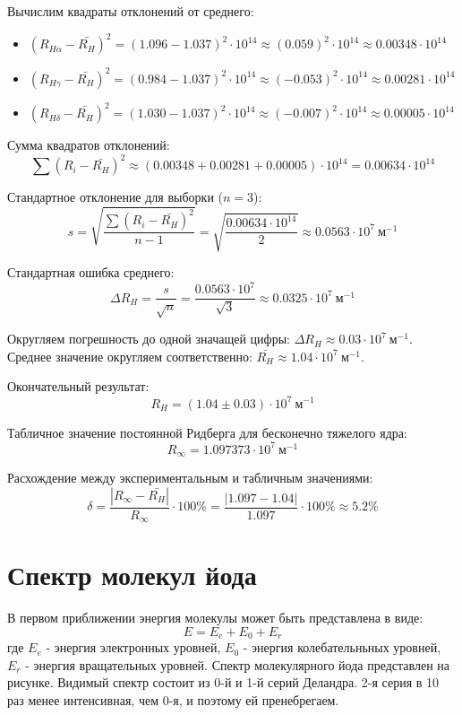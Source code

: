 \documentclass[a4paper,12pt]{article}
\begin{document}
\begin{enumerate}
    Вычислим квадраты отклонений от среднего:
    \begin{itemize}
        \item $(R_{H\alpha} - \bar{R_H})^2 = (1.096 - 1.037)^2 \cdot 10^{14} \approx (0.059)^2 \cdot 10^{14} \approx 0.00348 \cdot 10^{14}$
        \item $(R_{H\gamma} - \bar{R_H})^2 = (0.984 - 1.037)^2 \cdot 10^{14} \approx (-0.053)^2 \cdot 10^{14} \approx 0.00281 \cdot 10^{14}$
        \item $(R_{H\delta} - \bar{R_H})^2 = (1.030 - 1.037)^2 \cdot 10^{14} \approx (-0.007)^2 \cdot 10^{14} \approx 0.00005 \cdot 10^{14}$
    \end{itemize}
    
    Сумма квадратов отклонений:
    $$
    \sum (R_i - \bar{R_H})^2 \approx (0.00348 + 0.00281 + 0.00005) \cdot 10^{14} = 0.00634 \cdot 10^{14}
    $$
    
    Стандартное отклонение для выборки ($n = 3$):
    $$
    s = \sqrt{\frac{\sum (R_i - \bar{R_H})^2}{n-1}} = \sqrt{\frac{0.00634 \cdot 10^{14}}{2}} \approx 0.0563 \cdot 10^7\ \text{м}^{-1}
    $$
    
    Стандартная ошибка среднего:
    $$
    \Delta R_H = \frac{s}{\sqrt{n}} = \frac{0.0563 \cdot 10^7}{\sqrt{3}} \approx 0.0325 \cdot 10^7\ \text{м}^{-1}
    $$
    
    Округляем погрешность до одной значащей цифры: $\Delta R_H \approx 0.03 \cdot 10^7\ \text{м}^{-1}$. Среднее значение округляем соответственно: $\bar{R_H} \approx 1.04 \cdot 10^7\ \text{м}^{-1}$.
    
    Окончательный результат:
    $$
    R_H = (1.04 \pm 0.03) \cdot 10^7\ \text{м}^{-1}
    $$
    
    Табличное значение постоянной Ридберга для бесконечно тяжелого ядра:
    $$
    R_\infty = 1.097373 \cdot 10^7\ \text{м}^{-1}
    $$
    
    Расхождение между экспериментальным и табличным значениями:
    $$
    \delta = \frac{|R_\infty - \bar{R_H}|}{R_\infty} \cdot 100\% = \frac{|1.097 - 1.04|}{1.097} \cdot 100\% \approx 5.2\%
    $$
    
\end{enumerate}

\section{Спектр молекул йода}
В первом приближении энергия молекулы может быть представлена в виде:
$$
E = E_e + E_0 + E_r
$$
где $E_e$ - энергия электронных уровней, $E_0$ - энергия колебательньных уровней, $E_r$ - энергия вращательных уровней. Спектр молекулярного йода представлен на рисунке. Видимый спектр состоит из 0-й и 1-й серий Деландра. 2-я серия в 10 раз менее интенсивная, чем 0-я, и поэтому ей пренебрегаем.
\end{document}
